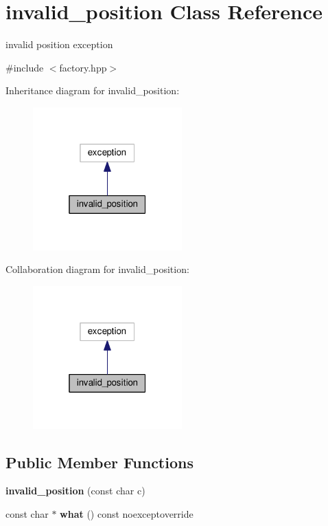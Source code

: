 \hypertarget{classinvalid__position}{}\section{invalid\+\_\+position Class Reference}
\label{classinvalid__position}


invalid position exception  




{\ttfamily \#include $<$factory.\+hpp$>$}



Inheritance diagram for invalid\+\_\+position\+:\nopagebreak
\begin{figure}[H]
\begin{center}
\leavevmode
\includegraphics[width=163pt]{classinvalid__position__inherit__graph}
\end{center}
\end{figure}


Collaboration diagram for invalid\+\_\+position\+:\nopagebreak
\begin{figure}[H]
\begin{center}
\leavevmode
\includegraphics[width=163pt]{classinvalid__position__coll__graph}
\end{center}
\end{figure}
\subsection*{Public Member Functions}
\begin{DoxyCompactItemize}
\item 
{\bfseries invalid\+\_\+position} (const char c)\hypertarget{classinvalid__position_a3d39f52e55d28fe6e9b4af02b7c6f278}{}\label{classinvalid__position_a3d39f52e55d28fe6e9b4af02b7c6f278}

\item 
const char $\ast$ {\bfseries what} () const noexceptoverride\hypertarget{classinvalid__position_a213d841079962a15c139c440167c40df}{}\label{classinvalid__position_a213d841079962a15c139c440167c40df}

\end{DoxyCompactItemize}


